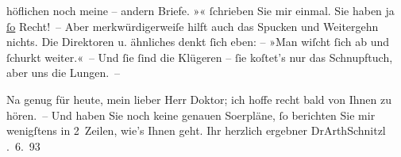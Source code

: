                höflichen noch meine – andern Briefe. »\label{K_L03944-7v}\label{K_L03944-7}« ſchrieben Sie mir einmal.
               Sie haben ja \uline{ſo} Recht! – Aber merkwürdigerweiſe hilft
               auch das Spucken und Weitergehn nichts. Die Direktoren u. ähnliches denkt {\pb}ſich eben:
               – »Man wiſcht ſich ab und ſchurkt weiter.« – Und ſie ſind die Klügeren – ſie koſtet’s
               nur das Schnupftuch, aber uns die Lungen. –\pend
           
\pstart
           Na genug für heute, mein lieber Herr Doktor; ich hoffe recht bald von Ihnen zu hören. –
               Und haben Sie noch keine genauen So{\geminationm}erpläne, ſo berichten Sie mir wenigſtens in
               2 Zeilen, wie’s Ihnen geht.\pend
           \pstart {\pb}Ihr herzlich ergebner \spacefill\mbox{DrArthSchnitzl}\pend{}
. 6. 93\pend
           \endnumbering{}
\begin{anhang}
\end{anhang}\newcommand{\dateiname}{L03944}\newcommand{\titel}{Arthur Schnitzler an Theodor Herzl, 13. 6. 1893}\newcommand{\editorInnen}{Herausgegeben von Jahnke, SelmaMüller, Martin Anton}
